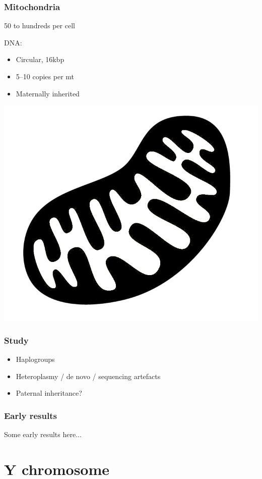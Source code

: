\documentclass[slidestop,14pt]{beamer}
\begin{document}
\begin{frame}
  \frametitle{Mitochondria}

  \vspace{\baselineskip}

  50 to hundreds per cell

  \vspace{0.5\baselineskip}

  DNA:
  \begin{itemize}
    \item Circular, 16kbp
    \item 5--10 copies per mt
    \item Maternally inherited
  \end{itemize}

  \vspace{-\baselineskip}

  \hspace{0.6\linewidth}\includegraphics[width=0.3\linewidth,transparent]{mitochondrion.png}
\end{frame}

\begin{frame}
  \frametitle{Study}

  \vspace{\baselineskip}

  \begin{itemize}
    \item Haplogroups
    \item Heteroplasmy / de novo / sequencing artefacts
    \item Paternal inheritance?
  \end{itemize}

\end{frame}

\begin{frame}
  \frametitle{Early results}

  \vspace{\baselineskip}

  Some early results here...
\end{frame}

\section{Y chromosome}
\end{document}
